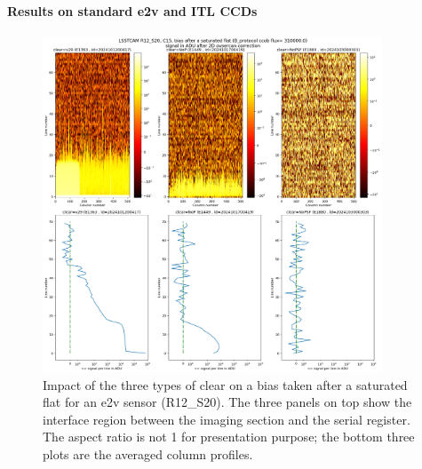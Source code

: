 \paragraph{Results on standard e2v and ITL CCDs}\label{results-on-standard-e2v-and-itl-ccd}

\begin{figure}
\begin{centering}
\includegraphics[width=0.9\textwidth]{figures/plots_R12_S20_C15_E1880_bias_2024103000303.png}
\end{centering}
\caption{Impact of the three types of clear on a bias
taken after a saturated flat for an e2v sensor (R12\_S20).
The three panels on top show the interface region between the imaging section and the serial register. The aspect ratio is not 1 for presentation purpose; the bottom three plots are the averaged column profiles.}
\label{fig:clear_e2v}
\end{figure}


